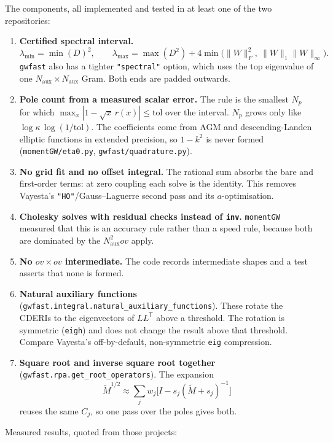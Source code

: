 \documentclass[11pt,a4paper]{article}
\newcommand{\code}[1]{\texttt{\small #1}}
\newcommand{\Naux}{N_{\mathrm{aux}}}
\newcommand{\Np}{N_{p}}
\newcommand{\ov}{ov}
\newcommand{\Mt}{\tilde{M}}
\begin{document}
\noindent The components, all implemented and tested in at least one of the two repositories:
\begin{enumerate}
  \item \textbf{Certified spectral interval.}
        \[\lambda_{\min}=\min(D)^2,\qquad
          \lambda_{\max}=\max(D^2)+4\min\big(\|W\|_F^2,\ \|W\|_1\|W\|_\infty\big).\]
        \code{gwfast} also has a tighter \code{"spectral"} option, which uses the top
        eigenvalue of one $\Naux\times\Naux$ Gram. Both ends are padded outwards.
  \item \textbf{Pole count from a measured scalar error.} The rule is the smallest $\Np$ for
        which $\max_x|1-\sqrt{x}\,r(x)|\le\mathrm{tol}$ over the interval. $\Np$ grows only like
        $\log\kappa\,\log(1/\mathrm{tol})$. The coefficients come from AGM and
        descending-Landen elliptic functions in extended precision, so $1-k^2$ is never formed
        (\code{momentGW/eta0.py}, \code{gwfast/quadrature.py}).
  \item \textbf{No grid fit and no offset integral.} The rational sum absorbs the bare and
        first-order terms: at zero coupling each solve is the identity. This removes Vayesta's
        \code{"HO"}/Gauss--Laguerre second pass and its $a$-optimisation.
  \item \textbf{Cholesky solves with residual checks instead of \code{inv}.} \code{momentGW}
        measured that this is an accuracy rule rather than a speed rule, because both are
        dominated by the $\Naux^2\ov$ apply.
  \item \textbf{No $\ov\times\ov$ intermediate.} The code records intermediate shapes and a test
        asserts that none is formed.
  \item \textbf{Natural auxiliary functions} (\code{gwfast.integral.natural\_auxiliary\_functions}).
        These rotate the CDERIs to the eigenvectors of $LL^{\mathsf T}$ above a threshold. The
        rotation is symmetric (\code{eigh}) and does not change the result above that threshold.
        Compare Vayesta's off-by-default, non-symmetric \code{eig} compression.
  \item \textbf{Square root and inverse square root together}
        (\code{gwfast.rpa.get\_root\_operators}). The expansion
        \[\Mt^{1/2}\approx\sum_j w_j\big[I - s_j(\Mt+s_j)^{-1}\big]\]
        reuses the same $C_j$, so one pass over the poles gives both.
\end{enumerate}

\noindent Measured results, quoted from those projects:
\end{document}
